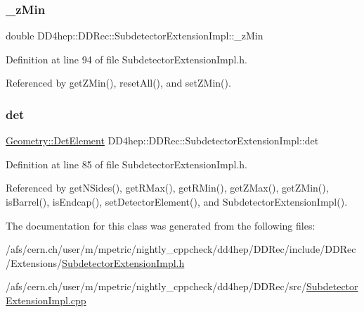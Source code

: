\hypertarget{class_d_d4hep_1_1_d_d_rec_1_1_subdetector_extension_impl_a33f8e745fb1bf3a861f69c1f3585c8b9}{}\label{class_d_d4hep_1_1_d_d_rec_1_1_subdetector_extension_impl_a33f8e745fb1bf3a861f69c1f3585c8b9} 
\subsubsection{\texorpdfstring{\+\_\+z\+Min}{\_zMin}}
{\footnotesize\ttfamily double D\+D4hep\+::\+D\+D\+Rec\+::\+Subdetector\+Extension\+Impl\+::\+\_\+z\+Min\hspace{0.3cm}{\ttfamily [protected]}}



Definition at line 94 of file Subdetector\+Extension\+Impl.\+h.



Referenced by get\+Z\+Min(), reset\+All(), and set\+Z\+Min().

\hypertarget{class_d_d4hep_1_1_d_d_rec_1_1_subdetector_extension_impl_a5573895361adac8070eb23454538d76e}{}\label{class_d_d4hep_1_1_d_d_rec_1_1_subdetector_extension_impl_a5573895361adac8070eb23454538d76e} 
\subsubsection{\texorpdfstring{det}{det}}
{\footnotesize\ttfamily \hyperlink{class_d_d4hep_1_1_geometry_1_1_det_element}{Geometry\+::\+Det\+Element} D\+D4hep\+::\+D\+D\+Rec\+::\+Subdetector\+Extension\+Impl\+::det\hspace{0.3cm}{\ttfamily [protected]}}



Definition at line 85 of file Subdetector\+Extension\+Impl.\+h.



Referenced by get\+N\+Sides(), get\+R\+Max(), get\+R\+Min(), get\+Z\+Max(), get\+Z\+Min(), is\+Barrel(), is\+Endcap(), set\+Detector\+Element(), and Subdetector\+Extension\+Impl().



The documentation for this class was generated from the following files\+:\begin{DoxyCompactItemize}
\item 
/afs/cern.\+ch/user/m/mpetric/nightly\+\_\+cppcheck/dd4hep/\+D\+D\+Rec/include/\+D\+D\+Rec/\+Extensions/\hyperlink{_subdetector_extension_impl_8h}{Subdetector\+Extension\+Impl.\+h}\item 
/afs/cern.\+ch/user/m/mpetric/nightly\+\_\+cppcheck/dd4hep/\+D\+D\+Rec/src/\hyperlink{_subdetector_extension_impl_8cpp}{Subdetector\+Extension\+Impl.\+cpp}\end{DoxyCompactItemize}
